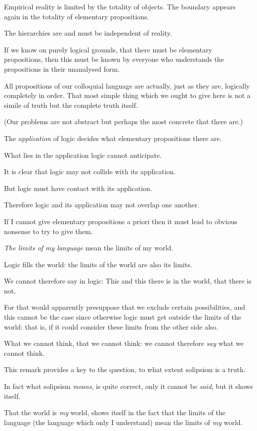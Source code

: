 {Empirical reality is limited by the totality of
objects. The boundary appears again in the
totality of elementary propositions.

The hierarchies are and must be independent
of reality.}


{If we know on purely logical grounds, that
there must be elementary propositions, then this
must be known by everyone who understands the
propositions in their unanalysed form.}


{All propositions of our colloquial language are
actually, just as they are, logically completely in
order. That most simple thing which we ought to
give here is not a simile of truth but the complete
truth itself.

(Our problems are not abstract but perhaps the
most concrete that there are.)}


{The \emph{application} of logic decides what elementary
propositions there are.

What lies in the application logic cannot
anticipate.

It is clear that logic may not collide with its
application.

But logic must have contact with its application.

Therefore logic and its application may not
overlap one another.}


{If I cannot give elementary propositions a
priori then it must lead to obvious nonsense to
try to give them.}


{\emph{The limits of my language} mean the limits of my
world.}


{Logic fills the world: the limits of the world
are also its limits.

We cannot therefore say in logic: This and
this there is in the world, that there is not.

For that would apparently presuppose that we
exclude certain possibilities, and this cannot be
the case since otherwise logic must get outside
the limits of the world: that is, if it could
consider these limits from the other side
also.

What we cannot think, that we cannot think:
we cannot therefore \emph{say} what we cannot
think.}


{This remark provides a key to the question, to
what extent solipsism is a truth.

In fact what solipsism \emph{means}, is quite correct,
only it cannot be \emph{said}, but it shows itself.

That the world is \emph{my} world, shows itself in the
fact that the limits of the language (the language
which only I understand) mean the limits of \emph{my}
world.}


